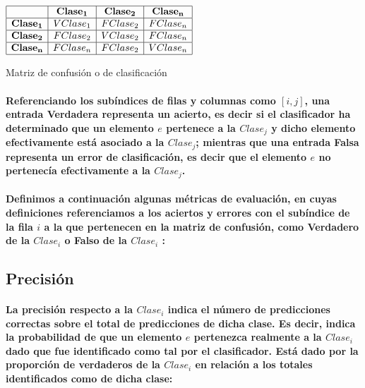 \begin{table}[htb] 
\centering

$
\begin{array}{|c|c|c|c|}
      \hline
         				& \mathbf{Clase_1}	& \mathbf{Clase_2}	& \mathbf{Clase_n}	\\
      \hline
      \mathbf{Clase_1}  & V	Clase_1	& F Clase_2	& F Clase_n	\\
      \hline
      \mathbf{Clase_2} 	& F Clase_2 & V Clase_2 & F Clase_n	\\
      \hline
      \mathbf{Clase_n}	& F Clase_n	& F	Clase_2	& V Clase_n	\\
      \hline
\end{array}
$
\caption{Matriz de confusi\'on o de clasificaci\'on}
\label{matrizconfusion}
\end{table}

\paragraph{Referenciando los sub\'indices de filas y columnas como $[i,j]$, una entrada Verdadera representa un acierto, es decir si el clasificador ha determinado que un elemento $e$ pertenece a la $Clase_j$ y dicho elemento efectivamente est\'a asociado a la $Clase_j$; mientras que una entrada Falsa representa un error de clasificaci\'on, es decir que el elemento $e$ no pertenec\'ia efectivamente a la $Clase_j$.} 
\paragraph{Definimos a continuaci\'on algunas m\'etricas de evaluaci\'on, en cuyas definiciones referenciamos a los aciertos y errores con el sub\'indice de la fila $i$ a la que pertenecen en la matriz de confusi\'on, como Verdadero de la $Clase_i$ o Falso de la $Clase_i$ :} 

\subsection{Precisi\'on}
\paragraph{La precisi\'on respecto a la $Clase_i$ indica el n\'umero de predicciones correctas sobre el total de predicciones de dicha clase. Es decir, indica la probabilidad de que un elemento $e$ pertenezca realmente a la $Clase_i$ dado que fue identificado como tal por el clasificador. Est\'a dado por la proporci\'on de verdaderos de la $Clase_i$ en relaci\'on a los totales identificados como de dicha clase: }
